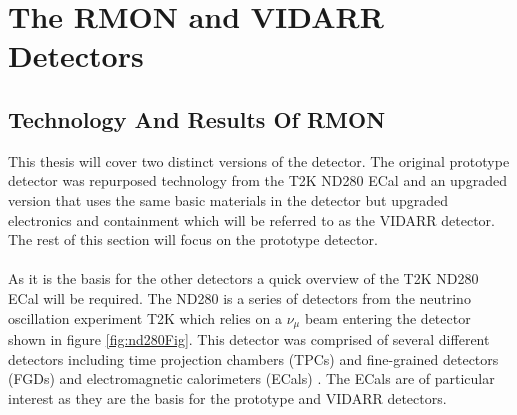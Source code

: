 
\ifpdf
    \graphicspath{{Chapter3/Figs/Raster/}{Chapter3/Figs/PDF/}{Chapter3/Figs/}}
\else
    \graphicspath{{Chapter3/Figs/Vector/}{Chapter3/Figs/}}
\fi


\chapter{The RMON and VIDARR Detectors}\label{Chp:ThePrototypeDetector}

\section{Technology And Results Of RMON}
This thesis will cover two distinct versions of the detector. The original prototype detector was repurposed technology from the T2K ND280 ECal \cite{Allan_2013} and an upgraded version that uses the same basic materials in the detector but upgraded electronics and containment which will be referred to as the VIDARR detector. The rest of this section will focus on the prototype detector.
\\\\As it is the basis for the other detectors a quick overview of the T2K ND280 ECal will be required. The ND280 is a series of detectors from the neutrino oscillation experiment T2K which relies on a $\nu_\mu$ beam entering the detector shown in figure \ref{fig:nd280Fig}. This detector was comprised of several different detectors including time projection chambers (TPCs) and fine-grained detectors (FGDs) and electromagnetic calorimeters (ECals) \cite{Allan_2013}. The ECals are of particular interest as they are the basis for the prototype and VIDARR detectors. 

